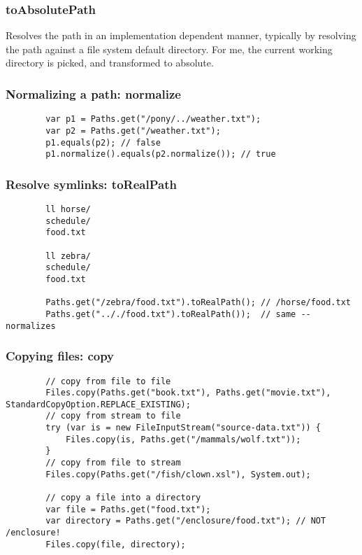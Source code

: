 \documentclass{scrartcl}
\begin{document}
\subsubsection{toAbsolutePath}

    Resolves the path in an implementation dependent manner, typically by resolving the path against a file system default directory.
    For me, the current working directory is picked, and transformed to absolute.

\subsubsection{Normalizing a path: normalize}

    \begin{lstlisting}
        var p1 = Paths.get("/pony/../weather.txt");
        var p2 = Paths.get("/weather.txt");
        p1.equals(p2); // false
        p1.normalize().equals(p2.normalize()); // true
    \end{lstlisting}

\subsubsection{Resolve symlinks: toRealPath}

    \begin{lstlisting}
        ll horse/
        schedule/
        food.txt

        ll zebra/
        schedule/
        food.txt

        Paths.get("/zebra/food.txt").toRealPath(); // /horse/food.txt
        Paths.get(".././food.txt").toRealPath());  // same -- normalizes
    \end{lstlisting}

\subsubsection{Copying files: copy}

    \begin{lstlisting}
        // copy from file to file
        Files.copy(Paths.get("book.txt"), Paths.get("movie.txt"), StandardCopyOption.REPLACE_EXISTING);
        // copy from stream to file
        try (var is = new FileInputStream("source-data.txt")) {
            Files.copy(is, Paths.get("/mammals/wolf.txt"));
        }
        // copy from file to stream
        Files.copy(Paths.get("/fish/clown.xsl"), System.out);

        // copy a file into a directory
        var file = Paths.get("food.txt");
        var directory = Paths.get("/enclosure/food.txt"); // NOT /enclosure!
        Files.copy(file, directory);
    \end{lstlisting}
\end{document}
